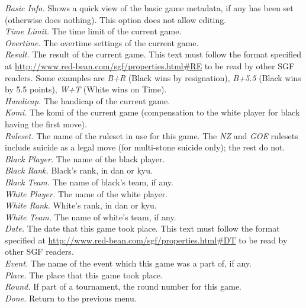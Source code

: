 \begin {description}
    \emph {Basic Info. } Shows a quick view of the basic game metadata, if any
    has been set (otherwise does nothing).  This option does not allow editing. \\
    \emph {Time Limit. } The time limit of the current game. \\
    \emph {Overtime. } The overtime settings of the current game. \\
    \emph {Result. } The result of the current game.  This text must follow the
    format specified at \url{http://www.red-bean.com/sgf/properties.html#RE} to
    be read by other SGF readers.  Some examples are \emph {B+R} (Black wins by
    resignation), \emph {B+5.5} (Black wins by 5.5 points), \emph {W+T} (White wins
    on Time). \\
    \emph {Handicap. } The handicap of the current game. \\
    \emph {Komi. } The komi of the current game (compensation to the white
    player for black having the first move). \\
    \emph {Ruleset. } The name of the ruleset in use for this game.  The \emph{NZ}
    and \emph{GOE} rulesets include suicide as a legal move (for multi-stone
    suicide only); the rest do not. \\
    \emph {Black Player. } The name of the black player. \\
    \emph {Black Rank. } Black's rank, in dan or kyu. \\
    \emph {Black Team. } The name of black's team, if any. \\
    \emph {White Player. } The name of the white player. \\
    \emph {White Rank. }  White's rank, in dan or kyu. \\
    \emph {White Team. } The name of white's team, if any. \\
    \emph {Date. } The date that this game took place.  This text must follow the
    format specified at \url{http://www.red-bean.com/sgf/properties.html#DT} to
    be read by other SGF readers. \\
    \emph {Event. } The name of the event which this game was a part of, if any.
    \\
    \emph {Place. } The place that this game took place. \\
    \emph {Round. } If part of a tournament, the round number for this game. \\
    \emph {Done. } Return to the previous menu. \\


\end{description}
